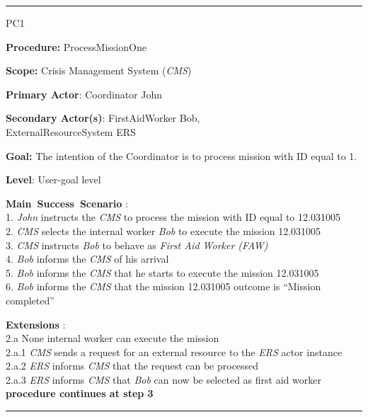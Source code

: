 \hrule
\begin{lyxlist}{PC1}

\small{

\item [\textbf{Procedure:}] ProcessMissionOne
\item [\textbf{Scope:}] Crisis Management System (\emph{CMS})
\item [\textbf{Primary Actor}:] Coordinator John
\item [\textbf{Secondary Actor(s)}:] FirstAidWorker Bob,\\
                  ExternalResourceSystem ERS
\item [\textbf{Goal:}] The intention of the Coordinator is to process mission
with ID equal to 1.
\item [\textbf{Level}:] User-goal level
\item [\textbf{Main~Success~Scenario}]:\\
1. \emph{John} instructs the \emph{CMS} to process the mission with ID equal to 12.031005\\
2. \emph{CMS} selects the internal worker \emph{Bob} to execute the mission 12.031005\\
3. \emph{CMS} instructs \emph{Bob} to behave as \emph{First Aid Worker (FAW)}\\
4. \emph{Bob} informs the \emph{CMS} of his arrival\\
5. \emph{Bob} informs the \emph{CMS} that he starts to execute the mission 12.031005\\
6. \emph{Bob} informs the \emph{CMS} that the mission 12.031005 outcome is ``Mission completed''


\item [\textbf{Extensions}]:\\
2.a None internal worker can execute the mission\\
\hspace*{0.5cm} 2.a.1 \emph{CMS} sends a request for an external resource to the \emph{ERS} actor instance\\
\hspace*{0.5cm} 2.a.2 \emph{ERS} informs \emph{CMS} that the request can be processed\\
\hspace*{0.5cm} 2.a.3 \emph{ERS} informs \emph{CMS} that \emph{Bob} can now be selected as first aid worker\\
\hspace*{0.5cm} \textbf{procedure continues at step 3}

}

\end{lyxlist}
\hrule
\vspace{0.5cm}




